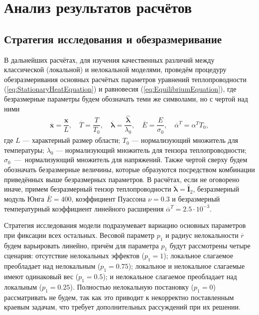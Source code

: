 \chapter{Анализ результатов расчётов}\label{ch:ResultsAnalysis} 

\section{Стратегия исследования и обезразмеривание}\label{sec:ResultsAnalysis/Strategy}

В дальнейших расчётах, для изучения качественных различий между классической (локальной) и нелокальной моделями, проведём процедуру обезразмеривания основных расчётых параметров уравнений теплопроводности (\ref{eq:StationaryHeatEquation}) и равновесия (\ref{eq:EquilibriumEquation}), где безразмерные параметры будем обозначать теми же символами, но с чертой над ними
\begin{gather*}
	\overline{\boldsymbol{x}} = \dfrac{\boldsymbol{x}}{L},
	\quad
	\overline{T} = \dfrac{T}{T_0},
	\quad
	\overline{\boldsymbol{\lambda}} = \dfrac{\widehat{\boldsymbol{\lambda}}}{\lambda_0},
	\quad
	\overline{E} = \dfrac{E}{\sigma_0},
	\quad
	\overline{\alpha}^T = \alpha^T T_0,
\end{gather*}
где $L$ --- характерный размер области; $T_0$ --- нормализующий множитель для температуры; $\lambda_0$ --- нормализующий множитель для тензора теплопроводности; $\sigma_0$~---~нормализующий множитель для напряжений. Также чертой сверху будем обозначать безразмерные величины, которые образуются посредством комбинации приведённых выше безразмерных параметров. В расчётах, если не оговорено иначе, примем безразмерный тензор теплопроводности $\overline{\boldsymbol{\lambda}} = \widehat{\textbf{I}}_2$, безразмерный модуль Юнга $\overline{E} = 400$, коэффициент Пуассона $\nu = 0.3$ и безразмерный температурный коэффициент линейного расширения $\overline{\alpha}^T = 2.5 \cdot 10^{-3}$.

Стратегия исследования модели подразумевает вариацию основных параметров при фиксации всех остальных. Весовой параметр $p_1$ и радиус нелокальности $\overline{r}$ будем варьировать линейно, причём для параметра $p_1$ будут рассмотрены четыре сценария: отсутствие нелокальных эффектов ($p_1 = 1$); локальное слагаемое преобладает над нелокальным ($p_1 = 0.75$); локальное и нелокальное слагаемые имеют одинаковый вес ($p_1 = 0.5$); и нелокальное слагаемое преобладает над локальным ($p_1 = 0.25$). Полностью нелокальную постановку ($p_1 = 0$) рассматривать не будем, так как это приводит к некорректно поставленным краевым задачам, что требует дополнительных рассуждений при их решении.

